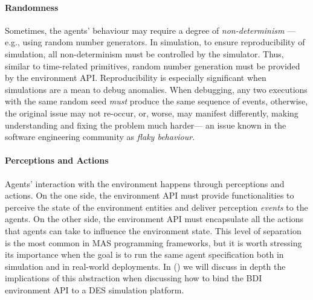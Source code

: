 \paragraph{Randomness}
Sometimes,
the agents' behaviour may require a degree of \emph{non-determinism}%
---e.g., using random number generators.
%
In simulation,
to ensure reproducibility of simulation,
all non-determinism must be controlled by the simulator.
%
Thus,
similar to time-related primitives,
random number generation
must be provided by the environment \ac{API}.
%
Reproducibility is especially significant when simulations are a mean
to debug anomalies.
When debugging, any two executions with the same random seed
\emph{must} produce the same sequence of events,
otherwise, the original issue may not re-occur,
or, worse, may manifest differently,
making understanding and fixing the problem much harder---%
an issue known in the software engineering community as \emph{flaky behaviour}\cite{DBLP:journals/tosem/ParryKHM22}.


\paragraph{Perceptions and Actions}
Agents' interaction with the environment
happens through perceptions and actions.
%
On the one side, the environment \ac{API} must provide functionalities
to perceive the state of the environment entities and deliver perception \emph{events}
to the agents.
%
On the other side, the environment \ac{API} must encapsulate all the actions
that agents can take to influence the environment state.
%
This level of separation is the most common in \ac{MAS} programming frameworks,
but it is worth stressing its importance
when the goal is to run the same agent specification
both in simulation and in real-world deployments.
%
In ()
we will discuss in depth the implications of this abstraction when
discussing how to bind the \ac{BDI} environment \ac{API}
to a \ac{DES} simulation platform.



